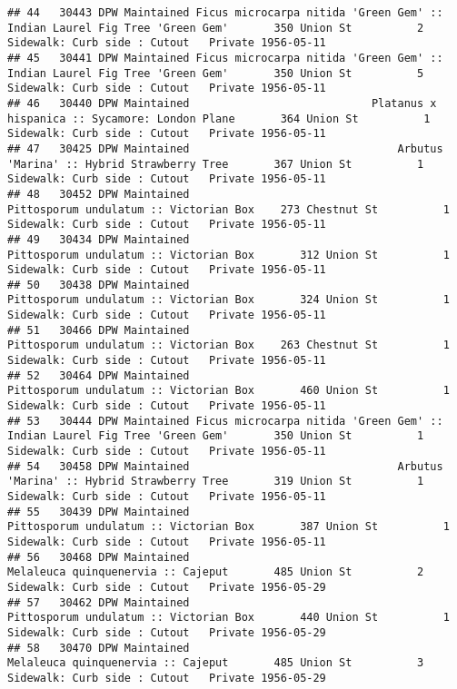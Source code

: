 \documentclass[
]{article}
\begin{document}
\begin{verbatim}
## 44   30443 DPW Maintained Ficus microcarpa nitida 'Green Gem' :: Indian Laurel Fig Tree 'Green Gem'       350 Union St          2 Sidewalk: Curb side : Cutout   Private 1956-05-11
## 45   30441 DPW Maintained Ficus microcarpa nitida 'Green Gem' :: Indian Laurel Fig Tree 'Green Gem'       350 Union St          5 Sidewalk: Curb side : Cutout   Private 1956-05-11
## 46   30440 DPW Maintained                            Platanus x hispanica :: Sycamore: London Plane       364 Union St          1 Sidewalk: Curb side : Cutout   Private 1956-05-11
## 47   30425 DPW Maintained                                Arbutus 'Marina' :: Hybrid Strawberry Tree       367 Union St          1 Sidewalk: Curb side : Cutout   Private 1956-05-11
## 48   30452 DPW Maintained                                    Pittosporum undulatum :: Victorian Box    273 Chestnut St          1 Sidewalk: Curb side : Cutout   Private 1956-05-11
## 49   30434 DPW Maintained                                    Pittosporum undulatum :: Victorian Box       312 Union St          1 Sidewalk: Curb side : Cutout   Private 1956-05-11
## 50   30438 DPW Maintained                                    Pittosporum undulatum :: Victorian Box       324 Union St          1 Sidewalk: Curb side : Cutout   Private 1956-05-11
## 51   30466 DPW Maintained                                    Pittosporum undulatum :: Victorian Box    263 Chestnut St          1 Sidewalk: Curb side : Cutout   Private 1956-05-11
## 52   30464 DPW Maintained                                    Pittosporum undulatum :: Victorian Box       460 Union St          1 Sidewalk: Curb side : Cutout   Private 1956-05-11
## 53   30444 DPW Maintained Ficus microcarpa nitida 'Green Gem' :: Indian Laurel Fig Tree 'Green Gem'       350 Union St          1 Sidewalk: Curb side : Cutout   Private 1956-05-11
## 54   30458 DPW Maintained                                Arbutus 'Marina' :: Hybrid Strawberry Tree       319 Union St          1 Sidewalk: Curb side : Cutout   Private 1956-05-11
## 55   30439 DPW Maintained                                    Pittosporum undulatum :: Victorian Box       387 Union St          1 Sidewalk: Curb side : Cutout   Private 1956-05-11
## 56   30468 DPW Maintained                                        Melaleuca quinquenervia :: Cajeput       485 Union St          2 Sidewalk: Curb side : Cutout   Private 1956-05-29
## 57   30462 DPW Maintained                                    Pittosporum undulatum :: Victorian Box       440 Union St          1 Sidewalk: Curb side : Cutout   Private 1956-05-29
## 58   30470 DPW Maintained                                        Melaleuca quinquenervia :: Cajeput       485 Union St          3 Sidewalk: Curb side : Cutout   Private 1956-05-29

\end{verbatim}
\end{document}
